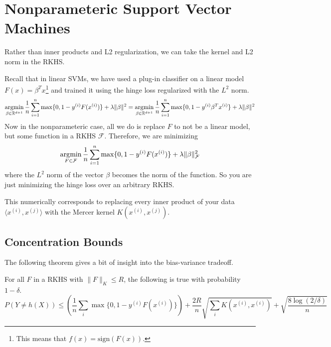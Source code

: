 \section{Nonparameteric Support Vector Machines} 

  Rather than inner products and L2 regularization, we can take the kernel and L2 norm in the RKHS.  

  Recall that in linear SVMs, we have used a plug-in classifier on a linear model $F(x) = \beta^T x$\footnote{This means that $f(x) = \mathrm{sign}(F(x))$.} and trained it using the hinge loss regularized with the $L^2$ norm. 
  \begin{equation}
    \argmin_{\beta \in \mathbb{R}^{d+1}} \frac{1}{n} \sum_{i=1}^n \max\{0, 1 - y^{(i)} F(x^{(i)})\} + \lambda \|\beta\|^2 = \argmin_{\beta \in \mathbb{R}^{d+1}} \frac{1}{n} \sum_{i=1}^n \max\{0, 1 - y^{(i)} \beta^T x^{(i)}\} + \lambda \|\beta\|^2
  \end{equation}
  Now in the nonparameteric case, all we do is replace $F$ to not be a linear model, but some function in a RKHS $\mathcal{F}$. Therefore, we are minimizing 
  \begin{equation}
    \argmin_{F \in \mathcal{F}} \frac{1}{n} \sum_{i=1}^n \max\{0, 1 - y^{(i)} F(x^{(i)})\} + \lambda \|\beta\|_{\mathcal{F}}^2
  \end{equation}
  where the $L^2$ norm of the vector $\beta$ becomes the norm of the function. So you are just minimizing the hinge loss over an arbitrary RKHS. 

  This numerically corresponds to replacing every inner product of your data $\langle x^{(i)}, x^{(j)} \rangle$ with the Mercer kernel $K(x^{(i)}, x^{(j)})$. 


\subsection{Concentration Bounds} 

  The following theorem gives a bit of insight into the bias-variance tradeoff. 

  \begin{theorem}
    For all $F$ in a RKHS with $\|F\|_K \leq R$, the following is true with probability $1 - \delta$. 
    \begin{equation}
      P(Y \neq h(X)) \leq \left( \frac{1}{n} \sum_{i} \max\{0, 1 - y^{(i)} F(x^{(i)})\} \right) + \frac{2R}{n} \sqrt{\sum_i K(x^{(i)}, x^{(i)})} + \sqrt{\frac{8 \log(2/\delta)}{n}}
    \end{equation}
  \end{theorem}

